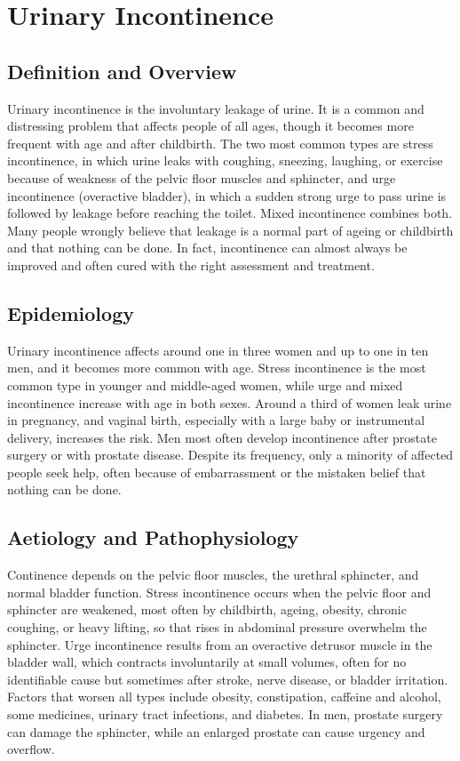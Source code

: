 \chapter{Urinary Incontinence}

\section*{Definition and Overview}
Urinary incontinence is the involuntary leakage of urine. It is a common and distressing problem that affects people of all ages, though it becomes more frequent with age and after childbirth. The two most common types are stress incontinence, in which urine leaks with coughing, sneezing, laughing, or exercise because of weakness of the pelvic floor muscles and sphincter, and urge incontinence (overactive bladder), in which a sudden strong urge to pass urine is followed by leakage before reaching the toilet. Mixed incontinence combines both. Many people wrongly believe that leakage is a normal part of ageing or childbirth and that nothing can be done. In fact, incontinence can almost always be improved and often cured with the right assessment and treatment.

\section*{Epidemiology}
Urinary incontinence affects around one in three women and up to one in ten men, and it becomes more common with age. Stress incontinence is the most common type in younger and middle-aged women, while urge and mixed incontinence increase with age in both sexes. Around a third of women leak urine in pregnancy, and vaginal birth, especially with a large baby or instrumental delivery, increases the risk. Men most often develop incontinence after prostate surgery or with prostate disease. Despite its frequency, only a minority of affected people seek help, often because of embarrassment or the mistaken belief that nothing can be done.

\section*{Aetiology and Pathophysiology}
Continence depends on the pelvic floor muscles, the urethral sphincter, and normal bladder function. Stress incontinence occurs when the pelvic floor and sphincter are weakened, most often by childbirth, ageing, obesity, chronic coughing, or heavy lifting, so that rises in abdominal pressure overwhelm the sphincter. Urge incontinence results from an overactive detrusor muscle in the bladder wall, which contracts involuntarily at small volumes, often for no identifiable cause but sometimes after stroke, nerve disease, or bladder irritation. Factors that worsen all types include obesity, constipation, caffeine and alcohol, some medicines, urinary tract infections, and diabetes. In men, prostate surgery can damage the sphincter, while an enlarged prostate can cause urgency and overflow.

